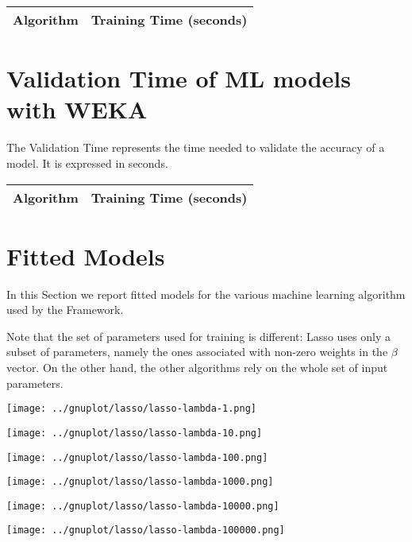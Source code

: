 \documentclass[10pt,a4paper]{article}
\begin{document}
\begin{center}
\begin{tabular}{cc}
\toprule
\textbf{Algorithm} & \textbf{Training Time (seconds)} \\
\midrule

\bottomrule
\end{tabular}
\end{center}



\section{Validation Time of ML models with WEKA }

The Validation Time represents the time needed to validate the accuracy of a model. It is expressed in seconds.

\begin{center}
\begin{tabular}{cc}
\toprule
\textbf{Algorithm} & \textbf{Training Time (seconds)} \\
\midrule

\bottomrule
\end{tabular}
\end{center}



\section{Fitted Models}

In this Section we report fitted models for the various machine learning algorithm used
by the Framework.

Note that the set of parameters used for training is different: Lasso uses only a subset
of parameters, namely the ones associated with non-zero weights in the $\beta$
vector. On the other hand, the other algorithms rely on the whole set of input parameters.

\texttt{[image: ../gnuplot/lasso/lasso-lambda-1.png]}

\texttt{[image: ../gnuplot/lasso/lasso-lambda-10.png]}

\texttt{[image: ../gnuplot/lasso/lasso-lambda-100.png]}

\texttt{[image: ../gnuplot/lasso/lasso-lambda-1000.png]}

\texttt{[image: ../gnuplot/lasso/lasso-lambda-10000.png]}

\texttt{[image: ../gnuplot/lasso/lasso-lambda-100000.png]}
\end{document}
